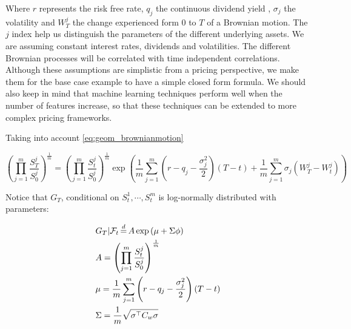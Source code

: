 Where $r$ represents the risk free rate, $q_j$ the continuous dividend yield , $\sigma_j$ the volatility and $W_T^j$ the change experienced form $0$ to $T$ of a Brownian motion. The $j$ index help us distinguish the parameters of the different underlying assets.
 We are assuming constant interest rates, dividends and volatilities. The different Brownian processes will be correlated with time independent correlations. Although these assumptions are simplistic from a pricing perspective, we make them for the base case example to have a simple closed form formula. We should also keep in mind that machine learning techniques perform well when the number of features increase, so that these techniques can be extended to more complex pricing frameworks. 

Taking into account \ref{eq:geom_brownianmotion}

\begin{equation}\label{eq:geom_digital_distrib}
\left(\prod_{j=1}^m\frac{S_{T}^{j}}{S_{0}^{j}}\right)^{\frac{1}{m}} =\left(\prod_{j=1}^m\frac{S_{t}^{j}}{S_{0}^{j}}\right)^{\frac{1}{m}}\exp\left(\frac{1}{m} \sum_{j=1}^{m}\left(r-q_{j}-\frac{\sigma_{j}^{2}}{2}\right) \left(T-t\right)+\frac{1}{m} \sum_{j=1}^{m} \sigma_{j} \left(W_{T}^{j}-W_{t}^{j}\right)\right) 
\end{equation}

Notice that $G_T$, conditional on $S_t^1,\cdots,S_t^m$ is log-normally distributed with parameters:



\begin{equation} 
\label{eq:geom_digital_distrib_params1}
\begin{aligned} 
& G_T|\mathcal{F}_t \eqdistr A \exp\left(\mu+\Sigma\phi\right)\\
& A = \left(\prod_{j=1}^m\frac{S_{t}^{j}}{S_{0}^{j}}\right)^{\frac{1}{m}} \\
&\mu = \frac{1}{m}\sum_{j=1}^{m}\left(r-q_{j}-\frac{\sigma_{j}^{2}}{2}\right)\left(T-t\right) \\   
& \Sigma=\frac{1}{m}\sqrt{\sigma^{\top} C_{w} \sigma}
\end{aligned}
\end{equation}

